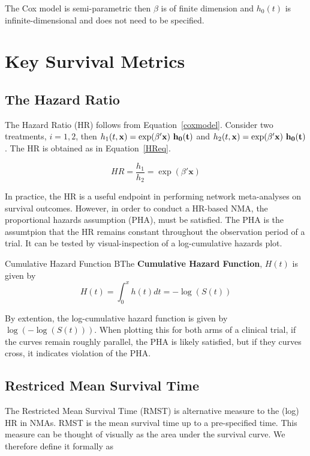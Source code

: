 The Cox model is semi-parametric then $\beta$ is of finite dimension and $h_0(t)$ is infinite-dimensional and does not need to be specified. 

\section{Key Survival Metrics}

\subsection{The Hazard Ratio}
The Hazard Ratio (HR) follows from Equation~\ref{coxmodel}. Consider two treatments, $i = 1, 2$, then $h_1(t, \bf{x}) = \exp(\beta'\textbf{x}) \ h_0(t)$ and $h_2(t, \bf{x}) = \exp(\beta'\textbf{x}) \ h_0(t)$. The HR is obtained as in Equation~\ref{HReq}.

\begin{equation}
    HR = \frac{h_1}{h_2} = \exp(\beta' \textbf{x})
    \label{HReq}
\end{equation}

In practice, the HR is a useful endpoint in performing network meta-analyses on survival outcomes. However, in order to conduct a HR-based NMA, the proportional hazards assumption (PHA), must be satisfied. The PHA is the assumtpion that the HR remains constant throughout the observation period of a trial. It can be tested by visual-inspection of a log-cumulative hazards plot. 

\begin{definition}{Cumulative Hazard Function}
    BThe \textbf{Cumulative Hazard Function}, $H(t)$ is given by 
    \[
        H(t) = \int_{0}^{x}h(t)dt = -\log(S(t))  
    \]
\end{definition}

By extention, the log-cumulative hazard function is given by $\log(-\log(S(t)))$. When plotting this for both arms of a clinical trial, if the curves remain roughly parallel, the PHA is likely satisfied, but if they curves cross, it indicates violation of the PHA.

\subsection{Restriced Mean Survival Time}
The Restricted Mean Survival Time (RMST) is alternative measure to the (log) HR in NMAs. RMST is the mean survival time up to a pre-specified time. This measure can be thought of visually as the area under the survival curve. We therefore define it formally as

